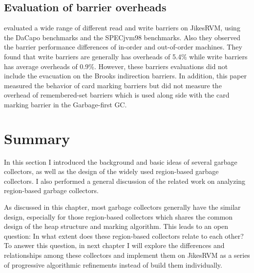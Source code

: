 \subsection{Evaluation of barrier overheads}

\cite{yang2012barriers} evaluated a wide range of different read and write barriers
on JikesRVM, using the DaCapo benchmarks and the SPECjvm98 benchmarks.
Also they observed the barrier performance differences of in-order and out-of-order machines.
They found that write barriers are generally has overheads of 5.4\% while write
barriers has average overheads of 0.9\%. However, these barriers evaluations did not
include the evacuation on the Brooks indirection barriers. In addition, this paper
measured the behavior of card marking barriers but did not measure the overhead of
remembered-set barriers which is used along side with the card marking barrier in
the Garbage-first GC.

\section{Summary}

In this section I introduced the background and basic ideas of several garbage collectors,
as well as the design of the widely used region-based garbage collectors.
I also performed a general discussion of the related work on analyzing region-based garbage collectors.

As discussed in this chapter, most garbage collectors generally have the similar design, especially for those
region-based collectors which shares the common design of the heap structure and
marking algorithm.
This leads to an open question: In what extent does these region-based collectors
relate to each other? To answer this question, in next chapter I will explore the
differences and relationships among these collectors and implement them on JikesRVM
as a series of progressive algorithmic refinements instead of build them individually.
